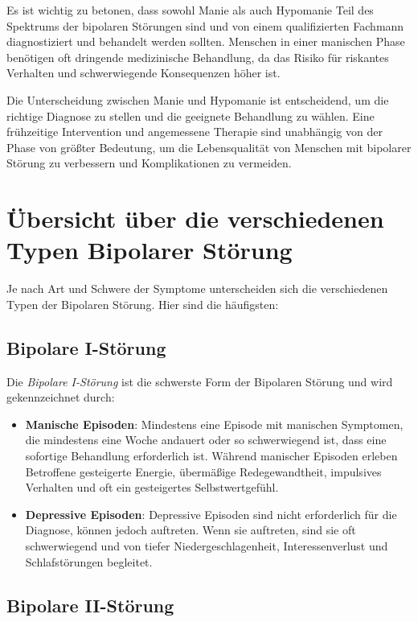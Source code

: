 Es ist wichtig zu betonen, dass sowohl Manie als auch Hypomanie Teil des Spektrums der bipolaren Störungen sind und von einem qualifizierten Fachmann diagnostiziert und behandelt werden sollten. Menschen in einer manischen Phase benötigen oft dringende medizinische Behandlung, da das Risiko für riskantes Verhalten und schwerwiegende Konsequenzen höher ist.

Die Unterscheidung zwischen Manie und Hypomanie ist entscheidend, um die richtige Diagnose zu stellen und die geeignete Behandlung zu wählen. Eine frühzeitige Intervention und angemessene Therapie sind unabhängig von der Phase von größter Bedeutung, um die Lebensqualität von Menschen mit bipolarer Störung zu verbessern und Komplikationen zu vermeiden.
%
\section{Übersicht über die verschiedenen Typen Bipolarer Störung}

Je nach Art und Schwere der Symptome unterscheiden sich die verschiedenen Typen der Bipolaren Störung. Hier sind die häufigsten:

\subsection{Bipolare I-Störung}

Die \emph{Bipolare I-Störung} ist die schwerste Form der Bipolaren Störung und wird gekennzeichnet durch:

\begin{itemize}
\item \textbf{Manische Episoden}: Mindestens eine Episode mit manischen Symptomen, die mindestens eine Woche andauert oder so schwerwiegend ist, dass eine sofortige Behandlung erforderlich ist. Während manischer Episoden erleben Betroffene gesteigerte Energie, übermäßige Redegewandtheit, impulsives Verhalten und oft ein gesteigertes Selbstwertgefühl.

\item \textbf{Depressive Episoden}: Depressive Episoden sind nicht erforderlich für die Diagnose, können jedoch auftreten. Wenn sie auftreten, sind sie oft schwerwiegend und von tiefer Niedergeschlagenheit, Interessenverlust und Schlafstörungen begleitet.
\end{itemize}

\subsection{Bipolare II-Störung}

